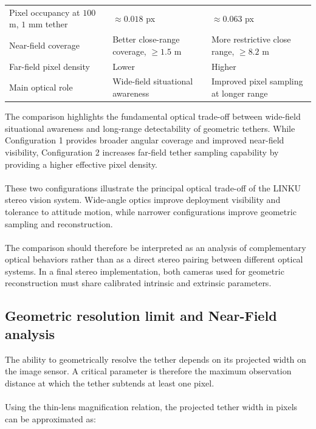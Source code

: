 \begin{table}[!ht]
\begin{tabularx}{\textwidth}{p{} X X}
Pixel occupancy at $100$ m, $1$ mm tether & $\approx 0.018$ px & $\approx 0.063$ px \\

Near-field coverage & Better close-range coverage, $\geq 1.5$ m & More restrictive close range, $\geq 8.2$ m \\

Far-field pixel density & Lower & Higher \\

Main optical role & Wide-field situational awareness & Improved pixel sampling at longer range \\

\bottomrule
\end{tabularx}
\end{table}

The comparison highlights the fundamental optical trade-off between wide-field situational awareness and long-range detectability of geometric tethers. While Configuration 1 provides broader angular coverage and improved near-field visibility, Configuration 2 increases far-field tether sampling capability by providing a higher effective pixel density.
\\\\
These two configurations illustrate the principal optical trade-off of the LINKU stereo vision system. Wide-angle optics improve deployment visibility and tolerance to attitude motion, while narrower configurations improve geometric sampling and reconstruction.
\\\\
The comparison should therefore be interpreted as an analysis of complementary optical behaviors rather than as a direct stereo pairing between different optical systems. In a final stereo implementation, both cameras used for geometric reconstruction must share calibrated intrinsic and extrinsic parameters.

\subsection{Geometric resolution limit and Near-Field analysis}

The ability to geometrically resolve the tether depends on its projected width on the image sensor. A critical parameter is therefore the maximum observation distance at which the tether subtends at least one pixel.
\\\\
Using the thin-lens magnification relation, the projected tether width in pixels can be approximated as:

